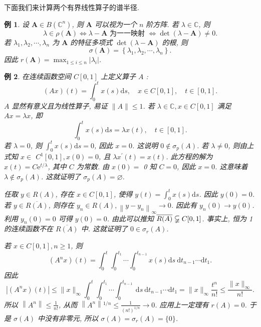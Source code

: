 \documentclass[openany]{ctexbook}
\theoremstyle{kaiti}
\theoremstyle{normal}
\newtheorem{example}{例}[section]
\begin{document}
下面我们来计算两个有界线性算子的谱半径.

\begin{example}
设 $\boldsymbol{A} \in B\left(\mathbb{C}^n\right)$, 则 $\boldsymbol{A}$ 可以视为一个 $n$ 阶方阵. 若 $\lambda \in \mathbb{C}$, 则
$$
\lambda \in \rho(\boldsymbol{A}) \Leftrightarrow \lambda-\boldsymbol{A} \text { 为一一映射 } \Leftrightarrow \operatorname{det}(\lambda-\boldsymbol{A}) \neq 0.
$$
若 $\lambda_1, \lambda_2, \cdots, \lambda_n$ 为 $\boldsymbol{A}$ 的特征多项式 $\operatorname{det}(\lambda-\boldsymbol{A})$ 的根, 则
$$
\sigma(\boldsymbol{A})=\left\{\lambda_1, \lambda_2, \cdots, \lambda_n\right\}.
$$
因此 $r(\boldsymbol{A})=\max_{1 \leqslant i \leqslant n}\left|\lambda_{i}\right|$.
\end{example}

\begin{example}
在连续函数空间 $C[0,1]$ 上定义算子 $A$ :
$$
(A x)(t)=\int_0^{t} x(s) \mathrm{d} s, \quad x \in C[0,1], \quad t \in[0,1].
$$
$A$ 显然有意义且为线性算子, 易证 $\|A\| \leqslant 1$.
若 $\lambda \in \mathbb{C}, x \in C[0,1]$ 满足 $A x=\lambda x$, 即
$$
\int_0^{t} x(s) \mathrm{d} s=\lambda x(t), \quad t \in[0,1].
$$
若 $\lambda=0$, 则 $\int_0^{t} x(s) \mathrm{d} s=0$, 因此 $x=0$. 这说明 $0 \notin \sigma_{p}(A)$. 若 $\lambda \neq 0$, 则由上式知 $x \in$ $C^1[0,1], x(0)=0$, 且 $\lambda x^{\prime}(t)=x(t)$. 此方程的解为 $x(t)=C \mathrm{e}^{t / \lambda}$, 其中 $C$ 为常数. 由 $x(0)=$ 0 知 $C=0$, 因此 $x=0$. 这意味着 $\lambda \notin \sigma_{p}(A)$. 这就证明了 $\sigma_{p}(A)=\varnothing$.

任取 $y \in R(A)$, 存在 $x \in C[0,1]$, 使得 $y(t)=\int_0^{t} x(s) \mathrm{d} s$. 因此 $y(0)=0$. 若 $y \in \overline{R(A)}$, 则存在 $y_n \in R(A),\left\|y-y_n\right\|_{\infty} \rightarrow 0$. 因此有 $y_n(0) \rightarrow y(0)$. 利用 $y_n(0)=0$ 可得 $y(0)=0$. 由此可以推知 $\overline{R(A)} \varsubsetneqq C[0,1]$. 事实上, 恒为 1 的连续函数不在 $\overline{R(A)}$ 中. 这就证明了 $0 \in \sigma_{r}(A)$.

若 $x \in C[0,1], n \geqslant 1$, 则
$$
\left(A^n x\right)(t)=\int_0^{t} \int_0^{t_1} \cdots \int_0^{t_{n-1}} x(s) \mathrm{d} s \mathrm{~d} t_{n-1} \cdots \mathrm{d} t_1.
$$
因此
$$
\left|\left(A^n x\right)(t)\right| \leqslant\|x\|_{\infty} \int_0^{t} \int_0^{t_1} \cdots \int_0^{t_{n-1}} \mathrm{~d} s \mathrm{~d} t_{n-1} \cdots \mathrm{d} t_1=\|x\|_{\infty} \frac{t^n}{n !} \leqslant \frac{\|x\|_{\infty}}{n !}.
$$
所以 $\left\|A^n\right\| \leqslant \frac{1}{n !}$, 从而 $\left\|A^n\right\|{ }^{1 / n} \leqslant \frac{1}{(n !)^{1 / n}} \rightarrow 0$. 应用上一定理有 $r(A)=0$. 于是 $\sigma(A)$ 中没有非零元, 所以 $\sigma(A)=\sigma_{r}(A)=\{0\}$.
\end{example}
\end{document}
